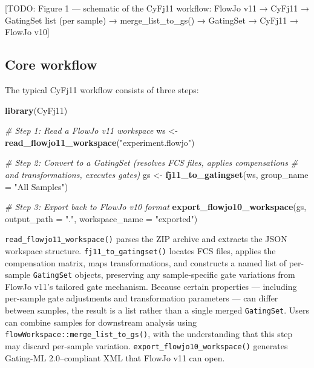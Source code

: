 \documentclass[
]{article}
\newenvironment{Shaded}{\begin{snugshade}}{\end{snugshade}}
\newcommand{\AttributeTok}[1]{\textcolor[rgb]{0.13,0.29,0.53}{#1}}
\newcommand{\CommentTok}[1]{\textcolor[rgb]{0.56,0.35,0.01}{\textit{#1}}}
\newcommand{\FunctionTok}[1]{\textcolor[rgb]{0.13,0.29,0.53}{\textbf{#1}}}
\newcommand{\NormalTok}[1]{#1}
\newcommand{\OtherTok}[1]{\textcolor[rgb]{0.56,0.35,0.01}{#1}}
\newcommand{\StringTok}[1]{\textcolor[rgb]{0.31,0.60,0.02}{#1}}
\begin{document}
\textcolor{pending}{[TODO: Figure 1 — schematic of the CyFj11 workflow: FlowJo v11 → CyFj11 → GatingSet list (per sample) → merge\_list\_to\_gs() → GatingSet → CyFj11 → FlowJo v10]}

\subsection{Core workflow}\label{core-workflow}

The typical CyFj11 workflow consists of three steps:

\begin{Shaded}
\begin{Highlighting}[]
\FunctionTok{library}\NormalTok{(CyFj11)}

\CommentTok{\# Step 1: Read a FlowJo v11 workspace}
\NormalTok{ws }\OtherTok{\textless{}{-}} \FunctionTok{read\_flowjo11\_workspace}\NormalTok{(}\StringTok{"experiment.flowjo"}\NormalTok{)}

\CommentTok{\# Step 2: Convert to a GatingSet (resolves FCS files, applies compensations}
\CommentTok{\#         and transformations, executes gates)}
\NormalTok{gs }\OtherTok{\textless{}{-}} \FunctionTok{fj11\_to\_gatingset}\NormalTok{(ws, }\AttributeTok{group\_name =} \StringTok{"All Samples"}\NormalTok{)}

\CommentTok{\# Step 3: Export back to FlowJo v10 format}
\FunctionTok{export\_flowjo10\_workspace}\NormalTok{(gs, }\AttributeTok{output\_path =} \StringTok{"."}\NormalTok{, }\AttributeTok{workspace\_name =} \StringTok{"exported"}\NormalTok{)}
\end{Highlighting}
\end{Shaded}

\texttt{read\_flowjo11\_workspace()} parses the ZIP archive and extracts
the JSON workspace structure. \texttt{fj11\_to\_gatingset()} locates FCS
files, applies the compensation matrix, maps transformations, and
constructs a named list of per-sample \texttt{GatingSet} objects,
preserving any sample-specific gate variations from FlowJo v11's
tailored gate mechanism. Because certain properties --- including
per-sample gate adjustments and transformation parameters --- can differ
between samples, the result is a list rather than a single merged
\texttt{GatingSet}. Users can combine samples for downstream analysis
using \texttt{flowWorkspace::merge\_list\_to\_gs()}, with the
understanding that this step may discard per-sample variation.
\texttt{export\_flowjo10\_workspace()} generates Gating-ML
2.0--compliant XML that FlowJo v11 can open.
\end{document}
